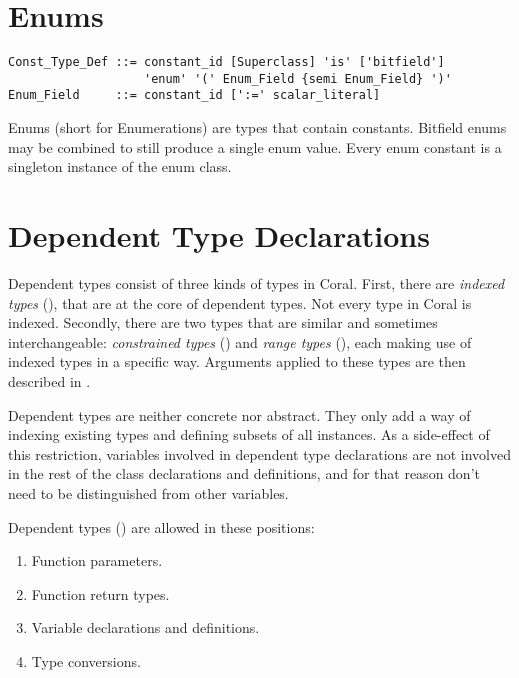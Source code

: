 \section{Enums}
\label{sec:enums}

\syntax\begin{lstlisting}
Const_Type_Def ::= constant_id [Superclass] 'is' ['bitfield'] 
                   'enum' '(' Enum_Field {semi Enum_Field} ')'
Enum_Field     ::= constant_id [':=' scalar_literal]
\end{lstlisting}


Enums (short for Enumerations) are types that contain constants. Bitfield enums may be combined to still produce a single enum value. Every enum constant is a singleton instance of the enum class. 

\section{Dependent Type Declarations}
\label{sec:dependent-types-decl}

Dependent types consist of three kinds of types in Coral. First, there are {\em indexed types} (), that are at the core of dependent types. Not every type in Coral is indexed. Secondly, there are two types that are similar and sometimes interchangeable: {\em constrained types} () and {\em range types} (), each making use of indexed types in a specific way. Arguments applied to these types are then described in . 

Dependent types are neither concrete nor abstract. They only add a way of indexing existing types and defining subsets of all instances. As a side-effect of this restriction, variables involved in dependent type declarations are not involved in the rest of the class declarations and definitions, and for that reason don't need to be distinguished from other variables. 

Dependent types () are allowed in these positions: 
\begin{enumerate}
\item Function parameters. 
\item Function return types. 
\item Variable declarations and definitions. 
\item Type conversions. 
\end{enumerate}

